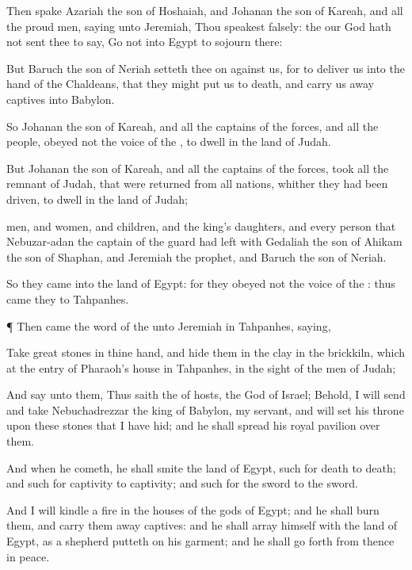 {Then
spake
Azariah the
son of
Hoshaiah, and
Johanan the
son of
Kareah, and all the
proud
men,
saying unto
Jeremiah, Thou
speakest
falsely: the
{} our
God hath not
sent thee to
say,
Go not into
Egypt to
sojourn there:

But
Baruch the
son of
Neriah setteth thee
on against us, for
to
deliver us into the
hand of the
Chaldeans, that they might put us to
death, and carry us away
captives into
Babylon.

So
Johanan the
son of
Kareah, and all the
captains of the
forces, and all the
people,
obeyed not the
voice of the
{}, to
dwell in the
land of
Judah.

But
Johanan the
son of
Kareah, and all the
captains of the
forces,
took all the
remnant of
Judah, that were
returned from all
nations, whither they had been
driven, to
dwell in the
land of
Judah;

men, and
women, and
children, and the
king’s
daughters, and every
person that
Nebuzar-adan the
captain of the
guard had
left with
Gedaliah the
son of
Ahikam the
son of
Shaphan, and
Jeremiah the
prophet, and
Baruch the
son of
Neriah.

So they
came into the
land of
Egypt: for they
obeyed not the
voice of the
{}: thus
came they
{} to
Tahpanhes.


\par }{\PP {}¶ Then came the
word of the
{} unto
Jeremiah in
Tahpanhes,
saying,

Take
great
stones in thine
hand, and
hide them in the
clay in the
brickkiln, which
{} at the
entry of
Pharaoh’s
house in
Tahpanhes, in the
sight of the
men of
Judah;

And
say unto them, Thus
saith the
{} of
hosts, the
God of
Israel; Behold, I will
send and
take
Nebuchadrezzar the
king of
Babylon, my
servant, and will
set his
throne
upon these
stones that I have
hid; and he shall
spread his royal
pavilion over them.

And when he
cometh, he shall
smite the
land of
Egypt,
{} such
{} for
death to
death; and such
{} for
captivity to
captivity; and such
{} for the
sword to the
sword.

And I will
kindle a
fire in the
houses of the
gods of
Egypt; and he shall
burn them, and carry them away
captives: and he shall
array himself with the
land of
Egypt, as a
shepherd putteth
on his
garment; and he shall go
forth from thence in
peace.

}
